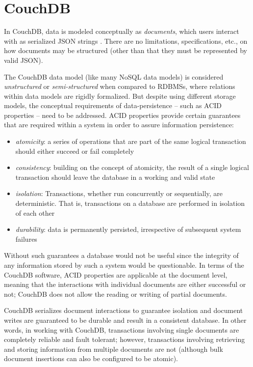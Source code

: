 \section{CouchDB}
In CouchDB, data is modeled conceptually as \textit{documents}, which users interact with as serialized JSON strings \cite{rfc7159}. There are no limitations, specifications, etc., on how documents may be structured (other than that they must be represented by valid JSON).

The CouchDB data model (like many NoSQL data models) is considered \textit{unstructured} or \textit{semi-structured} when compared to RDBMSs, where relations within data models are rigidly formalized. But despite using different storage models, the conceptual requirements of data-persistence – such as ACID properties – need to be addressed. ACID properties provide certain guarantees that are required within a system in order to assure information persistence:

\begin{itemize}
    \item \textit{atomicity}: a series of operations that are part of the same logical transaction should either succeed or fail completely
    \item \textit{consistency}: building on the concept of atomicity, the result of a single logical transaction should leave the database in a working and valid state
    \item \textit{isolation}: Transactions, whether run concurrently or sequentially, are deterministic. That is, transactions on a database are performed in isolation of each other
    \item \textit{durability}: data is permanently persisted, irrespective of subsequent system failures
\end{itemize}

Without such guarantees a database would not be useful since the integrity of any information stored by such a system would be questionable. In terms of the CouchDB software, ACID properties are applicable at the document level, meaning that the interactions with individual documents are either successful or not; CouchDB does not allow the reading or writing of partial documents.

CouchDB serializes document interactions to guarantee isolation and document writes are guaranteed to be durable and result in a consistent database. In other words, in working with CouchDB, transactions involving single documents are completely reliable and fault tolerant; however, transactions involving retrieving and storing information from multiple documents are not (although bulk document insertions can also be configured to be atomic).

